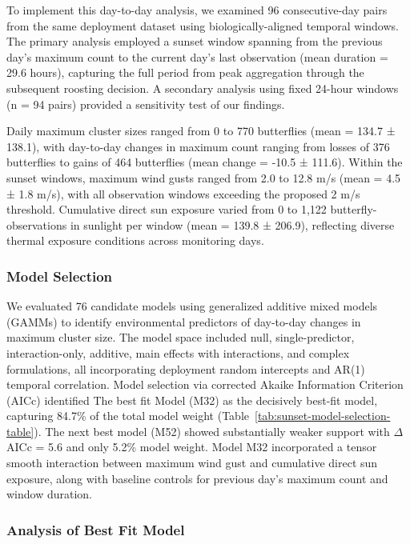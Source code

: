 To implement this day-to-day analysis, we examined 96 consecutive-day pairs from the same deployment dataset using biologically-aligned temporal windows. The primary analysis employed a sunset window spanning from the previous day's maximum count to the current day's last observation (mean duration = 29.6 hours), capturing the full period from peak aggregation through the subsequent roosting decision. A secondary analysis using fixed 24-hour windows (n = 94 pairs) provided a sensitivity test of our findings.

Daily maximum cluster sizes ranged from 0 to 770 butterflies (mean = 134.7 ± 138.1), with day-to-day changes in maximum count ranging from losses of 376 butterflies to gains of 464 butterflies (mean change = -10.5 ± 111.6). Within the sunset windows, maximum wind gusts ranged from 2.0 to 12.8 m/s (mean = 4.5 ± 1.8 m/s), with all observation windows exceeding the proposed 2 m/s threshold. Cumulative direct sun exposure varied from 0 to 1,122 butterfly-observations in sunlight per window (mean = 139.8 ± 206.9), reflecting diverse thermal exposure conditions across monitoring days.

\subsubsection{Model Selection}

We evaluated 76 candidate models using generalized additive mixed models (GAMMs) to identify environmental predictors of day-to-day changes in maximum cluster size. The model space included null, single-predictor, interaction-only, additive, main effects with interactions, and complex formulations, all incorporating deployment random intercepts and AR(1) temporal correlation. Model selection via corrected Akaike Information Criterion (AICc) identified The best fit Model (M32) as the decisively best-fit model, capturing 84.7\% of the total model weight (Table~\ref{tab:sunset-model-selection-table}). The next best model (M52) showed substantially weaker support with $\Delta$AICc = 5.6 and only 5.2\% model weight. Model M32 incorporated a tensor smooth interaction between maximum wind gust and cumulative direct sun exposure, along with baseline controls for previous day's maximum count and window duration.



\subsubsection{Analysis of Best Fit Model}

